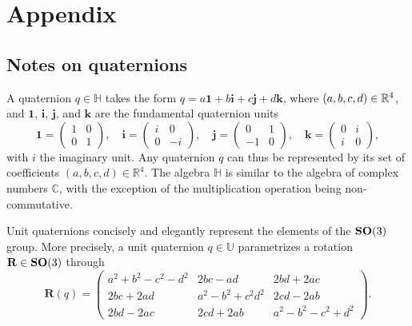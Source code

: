 \section{Appendix}

\subsection{Notes on quaternions}

A quaternion $q\in\mathbb{H}$ takes the form
$q =  a\boldsymbol{1} + b\boldsymbol{i} + c\boldsymbol{j} + d\boldsymbol{k}$,
where $(a,b,c,d) \in \mathbb{R}^4$, and $\boldsymbol{1}$, $\boldsymbol{i}$, $\boldsymbol{j}$, and $\boldsymbol{k}$ are the fundamental quaternion units
\begin{equation*}
    \boldsymbol{1} = \begin{pmatrix} 1 & 0 \\ 0 & 1 \end{pmatrix}, \quad
    \boldsymbol{i} = \begin{pmatrix} i & 0 \\ 0 & -i \end{pmatrix}, \quad
    \boldsymbol{j} = \begin{pmatrix} 0 & 1 \\ -1 & 0 \end{pmatrix}, \quad
    \boldsymbol{k} = \begin{pmatrix} 0 & i \\ i & 0 \end{pmatrix},
\end{equation*}
with $i$ the imaginary unit.
Any quaternion $q$ can thus be represented by its set of coefficients $(a,b,c,d)\in\mathbb{R}^4$.
The algebra $\mathbb{H}$ is similar to the algebra of complex numbers $\mathbb{C}$, with the exception of the multiplication operation being non-commutative.

Unit quaternions concisely and elegantly represent the elements of the $\mathrm{\mathbf{SO}}(3)$ group.
More precisely, a unit quaternion $q\in\mathbb{U}$ parametrizes a rotation $\mathbf{R}\in\mathrm{\mathbf{SO}}(3)$ through
\begin{equation*}
    \mathbf{R}(q) =\begin{pmatrix}
    a^2+b^2-c^2-d^2 & 2bc-ad & 2bd+2ac  \\
    2bc+2ad & a^2-b^2+c^2d^2 & 2cd-2ab \\
    2bd-2ac & 2cd+2ab & a^2-b^2-c^2+d^2
    \end{pmatrix}.
\end{equation*}



